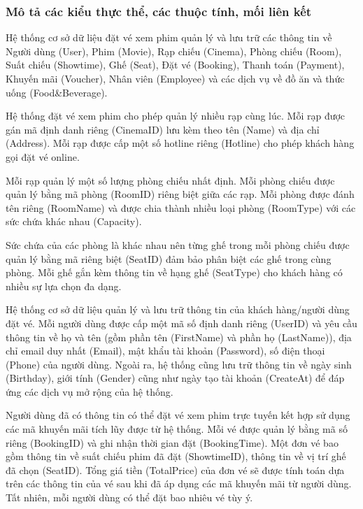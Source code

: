 \documentclass[a4paper]{article}
\newcommand{\cach}{\hspace*{1.5em}\ignorespaces}
\begin{document}
\subsubsection{Mô tả các kiểu thực thể, các thuộc tính, mối liên kết}
\cach Hệ thống cơ sở dữ liệu đặt vé xem phim quản lý và lưu trữ các thông tin về Người dùng (User), Phim (Movie), Rạp chiếu (Cinema), Phòng chiếu (Room), Suất chiếu (Showtime), Ghế (Seat), Đặt vé (Booking), Thanh toán (Payment), Khuyến mãi (Voucher), Nhân viên (Employee) và các dịch vụ về đồ ăn và thức uống (Food\&Beverage).

Hệ thống đặt vé xem phim cho phép quản lý nhiều rạp cùng lúc. 
Mỗi rạp được gán mã định danh riêng (CinemaID) lưu kèm theo tên (Name) và địa chỉ (Address). 
Mỗi rạp được cấp một số hotline riêng (Hotline) cho phép khách hàng gọi đặt vé online. 

Mỗi rạp quản lý một số lượng phòng chiếu nhất định. 
Mỗi phòng chiếu được quản lý bằng mã phòng (RoomID) riêng biệt giữa các rạp. 
Mỗi phòng được đánh tên riêng (RoomName) và được chia thành nhiều loại phòng (RoomType) với các sức chứa khác nhau (Capacity).

Sức chứa của các phòng là khác nhau nên từng ghế trong mỗi phòng chiếu được quản lý bằng mã riêng biệt (SeatID) đảm bảo phân biệt các ghế trong cùng phòng. 
Mỗi ghế gắn kèm thông tin về hạng ghế (SeatType) cho khách hàng có nhiều sự lựa chọn đa dạng.

Hệ thống cơ sở dữ liệu quản lý và lưu trữ thông tin của khách hàng/người dùng đặt vé. 
Mỗi người dùng được cấp một mã số định danh riêng (UserID) và yêu cầu thông tin về họ và tên (gồm phần tên (FirstName) và phần họ (LastName)), địa chỉ email duy nhất (Email), mật khẩu tài khoản (Password), số điện thoại (Phone) của người dùng. 
Ngoài ra, hệ thống cũng lưu trữ thông tin về ngày sinh (Birthday), giới tính (Gender) cũng như ngày tạo tài khoản (CreateAt) để đáp ứng các dịch vụ mở rộng của hệ thống.


Người dùng đã có thông tin có thể đặt vé xem phim trực tuyến kết hợp sử dụng các mã khuyến mãi tích lũy được từ hệ thống.
Mỗi vé được quản lý bằng mã số riêng (BookingID) và ghi nhận thời gian đặt (BookingTime). Một đơn vé bao gồm thông tin về suất chiếu phim đã đặt (ShowtimeID), thông tin về vị trí ghế đã chọn (SeatID). 
Tổng giá tiền (TotalPrice) của đơn vé sẽ được tính toán dựa trên các thông tin của vé sau khi đã áp dụng các mã khuyến mãi từ người dùng. 
Tất nhiên, mỗi người dùng có thể đặt bao nhiêu vé tùy ý.
\end{document}
